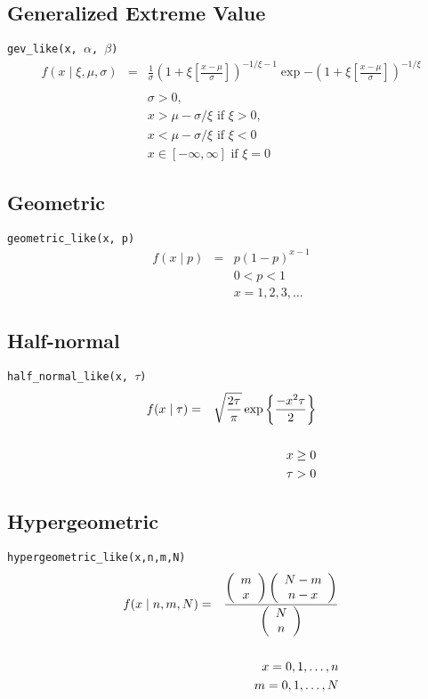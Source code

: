 \subsection*{Generalized Extreme Value}
\verb=gev_like(x, =$\alpha$\verb=, =$\beta$\verb=)=
\begin{eqnarray*}
f(x \mid \xi,\mu,\sigma) &=& \frac{1}{\sigma}(1 + \xi \left[\frac{x-\mu}{\sigma}\right])^{-1/\xi-1}\exp{-(1+\xi \left[\frac{x-\mu}{\sigma}\right])^{-1/\xi}}\\
\\
&& \sigma > 0,\\
&& x > \mu-\sigma/\xi \text{ if } \xi > 0,\\
&& x < \mu-\sigma/\xi \text{ if } \xi < 0\\
&& x \in [-\infty,\infty] \text{ if } \xi = 0
\end{eqnarray*}

\subsection*{Geometric}
\verb=geometric_like(x, p)=
\begin{eqnarray*}
f(x \mid p) &=& p(1-p)^{x-1} \\
&& 0 < p < 1 \\
&& x = 1,2,3,\ldots
\end{eqnarray*}

\subsection*{Half-normal}
\verb=half_normal_like(x, =$\tau$\verb=)=
\begin{eqnarray*}
f(x \mid \tau) &=& \sqrt{\frac{2\tau}{\pi}} \exp\left\{ {\frac{-x^2 \tau}{2}}\right\} \\
\vspace{3cm}\\
&& x \ge 0 \\
&& \tau > 0
\end{eqnarray*}

\subsection*{Hypergeometric}
\verb=hypergeometric_like(x,n,m,N)=
\begin{eqnarray*}
f(x \mid n, m, N) &=& \frac{\left(\begin{array}{c}m \\x\end{array}\right) \left(\begin{array}{c}N-m \\n-x\end{array}\right)}{\left(\begin{array}{c}N \\n\end{array}\right)} \\
\vspace{3cm}\\
&& x = 0,1,\ldots,n\\
&& m = 0,1,\ldots,N
\end{eqnarray*}

